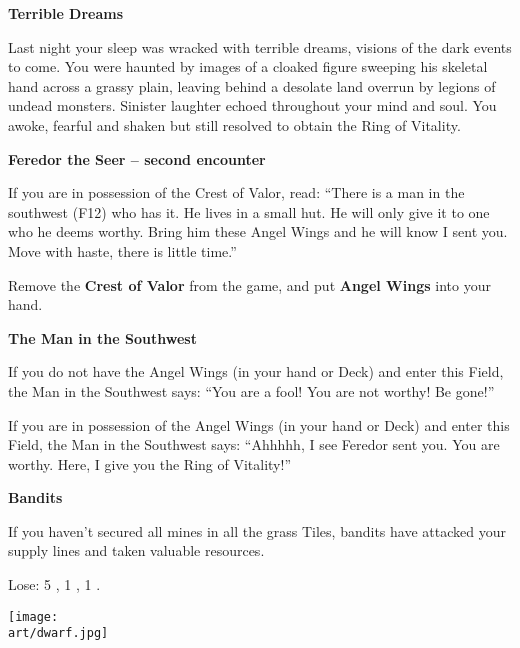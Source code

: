 \begin{multicols*}{2}
\textbf{Terrible Dreams}

Last night your sleep was wracked with terrible dreams, visions of the dark events to come.
You were haunted by images of a cloaked figure sweeping his skeletal hand across a grassy plain, leaving behind a desolate land overrun by legions of undead monsters.
Sinister laughter echoed throughout your mind and soul.
You awoke, fearful and shaken but still resolved to obtain the Ring of Vitality.

\textbf{Feredor the Seer -- second encounter}

If you are in possession of the Crest of Valor, read: ``There is a man in the southwest (F12) who has it.
He lives in a small hut.
He will only give it to one who he deems worthy.
Bring him these Angel Wings and he will know I sent you.
Move with haste, there is little time.''

\textcolor{darkcandyapplered}{Remove the \textbf{Crest of Valor} from the game, and put \textbf{Angel Wings} into your hand.}

\textbf{The Man in the Southwest}

If you do not have the Angel Wings (in your hand or Deck) and enter this Field, the Man in the Southwest says: ``You are a fool! You are not worthy! Be gone!''

If you are in possession of the Angel Wings (in your hand or Deck) and enter this Field, the Man in the Southwest says: ``Ahhhhh, I see Feredor sent you.
You are worthy.
Here, I give you the Ring of Vitality!''

\textbf{Bandits}

If you haven't secured all mines in all the grass Tiles, bandits have attacked your supply lines and taken valuable resources.

\textcolor{darkcandyapplered}{Lose:} 5 , 1 , 1 .

\vspace*{\fill}
\texttt{[image: \\art/dwarf.jpg]}

\end{multicols*}

